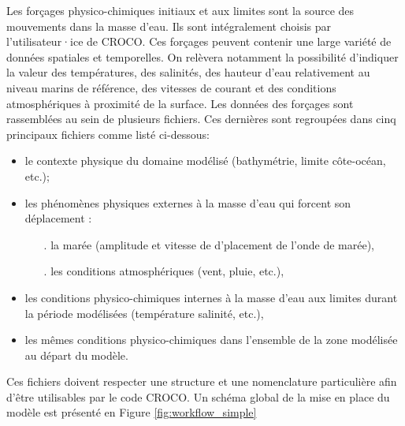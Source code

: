 \documentclass[10pt,a4paper,titlepage]{article}
\begin{document}
Les forçages physico-chimiques initiaux et aux limites sont la source des mouvements dans la masse d'eau.
Ils sont intégralement choisis par l'utilisateur·ice de CROCO.
Ces forçages peuvent contenir une large variété de données spatiales et temporelles.
On relèvera notamment la possibilité d'indiquer la valeur des températures, des salinités, des hauteur d'eau relativement au niveau marins de référence, des vitesses de courant et des conditions atmosphériques à proximité de la surface.
Les données des forçages sont rassemblées au sein de plusieurs fichiers.
Ces dernières sont regroupées dans cinq principaux fichiers comme listé ci-dessous:

\begin{itemize}
    \item le contexte physique du domaine modélisé (bathymétrie, limite côte-océan, etc.);
    \item les phénomènes physiques externes à la masse d'eau qui forcent son déplacement :
    \begin{itemize}
        \item[.] la marée (amplitude et vitesse de d'placement de l'onde de marée),
        \item[.] les conditions atmosphériques (vent, pluie, etc.),
    \end{itemize}
    \item les conditions physico-chimiques internes à la masse d'eau aux limites durant la période modélisées (température salinité, etc.),
    \item les mêmes conditions physico-chimiques dans l'ensemble de la zone modélisée au départ du modèle.
\end{itemize}
Ces fichiers doivent respecter une structure et une nomenclature particulière afin d'être utilisables par le code CROCO.
Un schéma global de la mise en place du modèle est présenté en Figure \ref{fig:workflow_simple}
\end{document}
